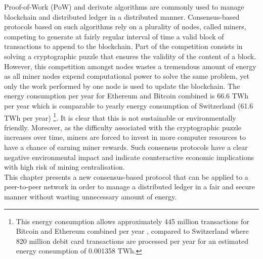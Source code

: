 Proof-of-Work (PoW) and derivate algorithms are commonly used to manage blockchain and distributed ledger in a distributed manner. Consensus-based protocols based on such algorithms rely on a plurality of nodes, called miners, competing to generate at fairly regular interval of time a valid block of transactions to append to the blockchain. Part of the competition consists in solving a cryptographic puzzle that ensures the validity of the content of a block. \\

However, this competition amongst nodes wastes a tremendous amount of energy as all miner nodes expend computational power to solve the same problem, yet only the work performed by one node is used to update the blockchain. The energy consumption per year for Ethereum and Bitcoin combined is 66.6 TWh per year which is comparable to yearly energy consumption of Switzerland (61.6 TWh per year) \cite{electric}\footnote{This energy consumption allows approximately 445 million transactions for Bitcoin and Ethereum combined per year \cite{BitTxpD, EthTxpD}, compared to Switzerland where 820 million debit card transactions are processed per year \cite{swis} for an estimated energy consumption of 0.001358 TWh.}. It is clear that this is not sustainable or environmentally friendly. Moreover, as the difficulty associated with the cryptographic puzzle increases over time, miners are forced to invest in more computer resources to have a chance of earning miner rewards. Such consensus protocols have a clear negative environmental impact and indicate counteractive economic implications with high risk of mining centralisation. \\

This chapter presents a new consensus-based protocol that can be applied to a peer-to-peer network in order to manage a distributed ledger in a fair and secure manner without wasting unnecessary amount of energy. 